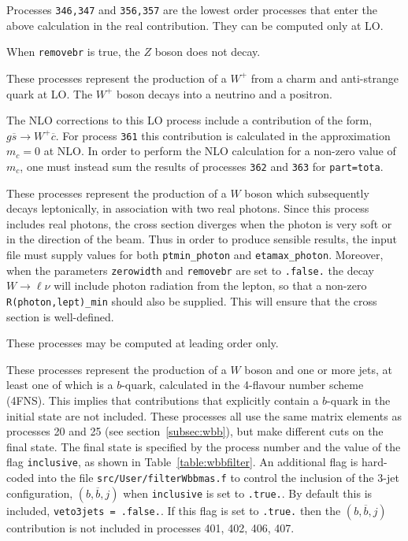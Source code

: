 Processes {\tt 346,347} and {\tt 356,357} are the lowest order processes that enter
the above calculation in the real contribution. They can be computed only at LO.

When {\tt removebr} is true, the $Z$ boson does not decay.

\label{subsec:csbar}
These processes represent the production of a $W^+$ from a charm and anti-strange
quark at LO. The $W^+$ boson decays into a neutrino and a positron.

The NLO corrections to this LO process include a contribution of the form,
$g\overline s \to W^+ \overline c$. For process {\tt 361} this contribution is
calculated in the approximation $m_c=0$ at NLO. In order to perform the NLO calculation 
for a non-zero value of $m_c$, one must instead sum the results of processes {\tt 362}
and {\tt 363} for {\tt part=tota}.

\label{subsec:wgamgam}

These processes represent the production of a $W$ boson which subsequently
decays leptonically, in association with two real photons.
Since this process includes real photons, the cross section diverges
when the photon is very soft or in the direction of the beam.
Thus in order to produce sensible results, the input file must supply values for both
{\tt ptmin\_photon} and {\tt etamax\_photon}. Moreover, when the parameters {\tt zerowidth}
and {\tt removebr} are set to {\tt .false.} the decay $W \to \ell \nu$ will include
photon radiation from the lepton, so that a non-zero {\tt R(photon,lept)\_min} should
also be supplied. This will ensure that the cross section is well-defined.

These processes may be computed at leading order only.

\label{subsec:wbbfilter}
These processes represent the production of a $W$ boson and one or more jets,
at least one of which is a $b$-quark, calculated in the 4-flavour number scheme (4FNS). 
This implies that contributions that explicitly contain a $b$-quark in the initial state
are not included.
These processes all use the same matrix
elements as processes 20 and 25 (see section~\ref{subsec:wbb}), but make different
cuts on the final state. The final state is specified by the process number and
the value of the flag {\tt inclusive}, as shown in Table~\ref{table:wbbfilter}.
An additional flag is hard-coded into the file {\tt src/User/filterWbbmas.f} to control
the inclusion of the 3-jet configuration, $(b,\overline b,j)$ when {\tt inclusive} is set to {\tt .true.}.
By default this is included, {\tt veto3jets = .false.}. If this flag is set to {\tt .true.} 
then the $(b,\overline b,j)$ contribution
is not included in processes 401, 402, 406, 407.

